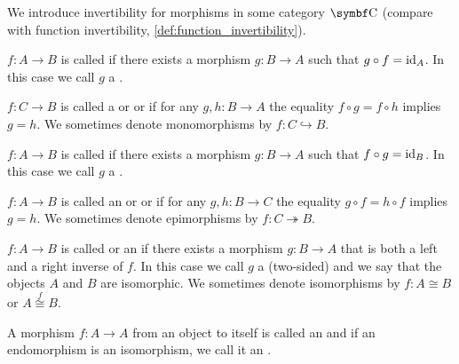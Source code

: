 \begin{definition}\label{def:morphism_invertibility}
  We introduce invertibility for morphisms in some category \( \Bold C \) (compare with function invertibility, \cref{def:function_invertibility}).

  \begin{defenum}
     \( f: A \to B \) is called  if there exists a morphism \( g: B \to A \) such that \( g \circ f = \operatorname{id}_A \). In this case we call \( g \) a .

     \( f: C \to B \) is called a  or  or  if for any \( g, h: B \to A \) the equality \( f \circ g = f \circ h \) implies \( g = h \). We sometimes denote monomorphisms by \( f: C \hookrightarrow B \).

     \( f: A \to B \) is called  if there exists a morphism \( g: B \to A \) such that \( f \circ g = \operatorname{id}_B \). In this case we call \( g \) a .

     \( f: A \to B \) is called an  or  or  if for any \( g, h: B \to C \) the equality \( g \circ f = h \circ f \) implies \( g = h \). We sometimes denote epimorphisms by \( f: C \twoheadrightarrow B \).

     \( f: A \to B \) is called  or an  if there exists a morphism \( g: B \to A \) that is both a left and a right inverse of \( f \). In this case we call \( g \) a (two-sided)  and we say that the objects \( A \) and \( B \) are isomorphic. We sometimes denote isomorphisms by \( f: A \cong B \) or \( A \overset f \cong B \). 

     A morphism \( f: A \to A \) from an object to itself is called an  and if an endomorphism is an isomorphism, we call it an .
  \end{defenum}
\end{definition}

